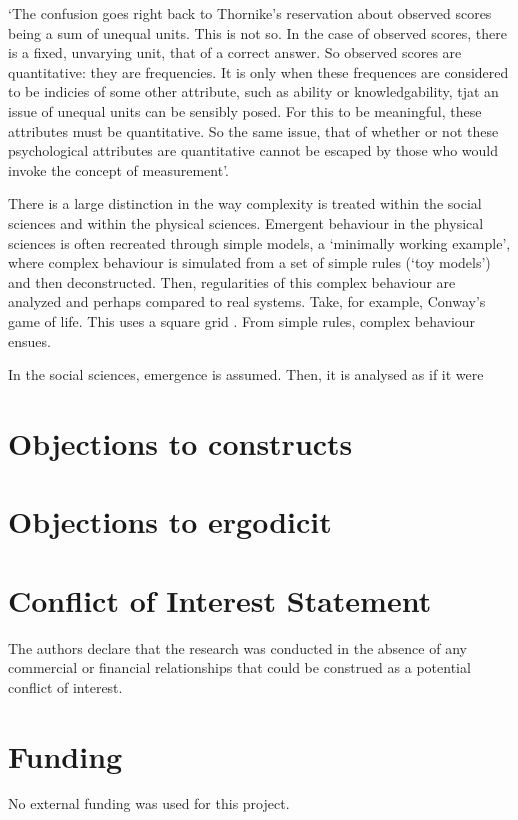 \documentclass[utf8]{FrontiersinVancouver}
\begin{document}
    `The confusion goes right back to Thornike's reservation about observed scores being a sum of unequal units. This is not so. In the case of observed scores, there is a fixed, unvarying unit, that of a correct answer. So observed scores are quantitative: they are frequencies. It is only when these frequences are considered to be indicies of some other attribute, such as ability or knowledgability, tjat an issue of unequal units can be sensibly posed. For this to be meaningful, these attributes must be quantitative. So the same issue, that of whether or not these psychological attributes are quantitative cannot be escaped by those who would invoke the concept of measurement'.


There is a large distinction in the way complexity is treated within the social sciences and within the physical sciences. Emergent behaviour in the physical sciences is often recreated through simple models, a `minimally working example', where complex behaviour is simulated from a set of simple rules (`toy models') and then deconstructed. Then, regularities of this complex behaviour are analyzed and perhaps compared to real systems. Take, for example, Conway's game of life. This uses a square grid . From simple rules, complex behaviour ensues. 

In the social sciences, emergence is assumed. Then, it is analysed as if it were 

\section{Objections to constructs}
\section{Objections to ergodicit}


\citep{slaneyWhatNamePsychology2013}
\citep{burgosRealProblemHypothetical2021}

\section*{Conflict of Interest Statement}
The authors declare that the research was conducted in the absence of any commercial or financial relationships that could be construed as a potential conflict of interest.

\section*{Funding}
No external funding was used for this project.
\end{document}
